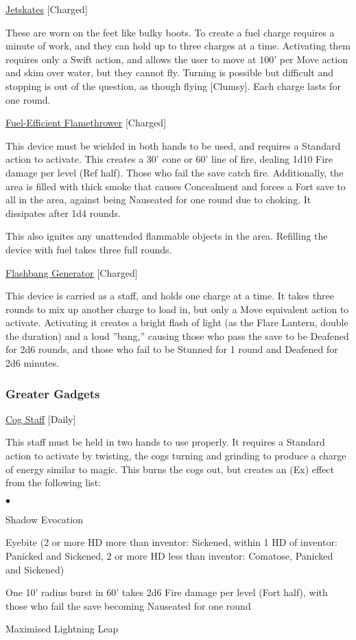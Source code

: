 \medskip\noindent\underline{Jetskates} [Charged]
 
\noindent These are worn on the feet like bulky boots. To create a fuel charge requires a minute of work, and they can hold up to three charges at a time. Activating them requires only a Swift action, and allows the user to move at 100' per Move action and skim over water, but they cannot fly. Turning is possible but difficult and stopping is out of the question, as though flying [Clumsy]. Each charge lasts for one round. 

\medskip\noindent\underline{Fuel-Efficient Flamethrower} [Charged]
 
\noindent This device must be wielded in both hands to be used, and requires a Standard action to activate. This creates a 30' cone or 60' line of fire, dealing 1d10 Fire damage per level (Ref half). Those who fail the save catch fire. Additionally, the area is filled with thick smoke that causes Concealment and forces a Fort save to all in the area, against being Nauseated for one round due to choking. It dissipates after 1d4 rounds. 

\smallskip\noindent This also ignites any unattended flammable objects in the area. Refilling the device with fuel takes three full rounds. 

\medskip\noindent\underline{Flashbang Generator} [Charged] 

\noindent This device is carried as a staff, and holds one charge at a time. It takes three rounds to mix up another charge to load in, but only a Move equivalent action to activate. Activating it creates a bright flash of light (as the Flare Lantern, double the duration) and a loud ''bang,'' causing those who pass the save to be Deafened for 2d6 rounds, and those who fail to be Stunned for 1 round and Deafened for 2d6 minutes. 

\subsubsection{Greater Gadgets}

\noindent\underline{Cog Staff} [Daily]
 
\noindent This staff must be held in two hands to use properly. It requires a Standard action to activate by twisting, the cogs turning and grinding to produce a charge of energy similar to magic. This burns the cogs out, but creates an (Ex) effect from the following list:

\begin{list}{$\bullet$}{\itemspace}
\item Shadow Evocation 
\item Eyebite (2 or more HD more than inventor: Sickened, within 1 HD of inventor: Panicked and Sickened, 2 or more HD less than inventor: Comatose, Panicked and Sickened) 
\item One 10' radius burst in 60' takes 2d6 Fire damage per level (Fort half), with those who fail the save becoming Nauseated for one round 
\item Maximised Lightning Leap
\end{list}

